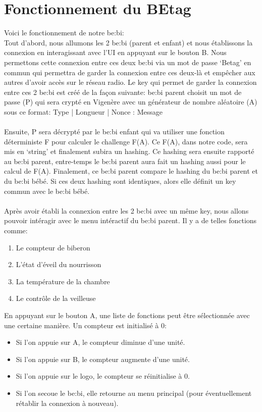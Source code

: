 \documentclass [11pt]{article}
\begin{document}
\section{Fonctionnement du BEtag}
Voici le fonctionnement de notre be\string:bi\string:
\\ Tout d’abord, nous allumons les 2 be\string:bi (parent et enfant) et nous établissons la connexion en interagissant avec l’UI en appuyant sur le bouton B. Nous permettons cette connexion entre ces deux be\string:bi via un mot de passe ‘Betag’ en commun qui permettra de garder la connexion entre ces deux-là et empêcher aux autres d’avoir accès sur le réseau radio. Le key qui permet de garder la connexion entre ces 2 be\string:bi est créé de la façon suivante\string:
be\string:bi parent choisit un mot de passe (P) qui sera crypté en Vigenère avec un générateur de nombre aléatoire (A) sous ce format\string: Type | Longueur | Nonce : Message
\\
\\ Ensuite, P sera décrypté par le be\string:bi enfant qui va utiliser une fonction déterministe F pour calculer le challenge F(A). Ce F(A), dans notre code, sera mis en ‘string’ et finalement subira un hashing.
\noindent Ce hashing sera ensuite rapporté au be\string:bi parent, entre-temps le be\string:bi parent aura fait un hashing aussi pour le calcul de F(A). Finalement, ce be\string:bi parent compare le hashing du be\string:bi parent et du be\string:bi bébé. Si ces deux hashing sont identiques, alors elle définit un key commun avec le be\string:bi bébé.
\\
\\
\noindent Après avoir établi la connexion entre les 2 be\string:bi avec un même key, nous allons pouvoir intéragir avec le menu intéractif du be\string:bi parent. Il y a de telles fonctions comme:
\begin{enumerate}
\item Le compteur de biberon
\item L’état d’éveil du nourrisson
\item La température de la chambre
\item Le contrôle de la veilleuse
\end{enumerate}
\noindent En appuyant sur le bouton A, une liste de fonctions peut être sélectionnée avec une certaine manière. Un compteur est initialisé à 0:
\begin{itemize}
    \item[\textbullet] Si l'on appuie sur A, le compteur diminue d'une unité.
    \item[\textbullet] Si l'on appuie sur B, le compteur augmente d'une unité.
    \item[\textbullet] Si l'on appuie sur le logo, le compteur se réinitialise à 0.
    \item[\textbullet] Si l'on secoue le be\string:bi, elle retourne au menu principal (pour éventuellement rétablir la connexion à nouveau).
\end{itemize}
\end{document}
